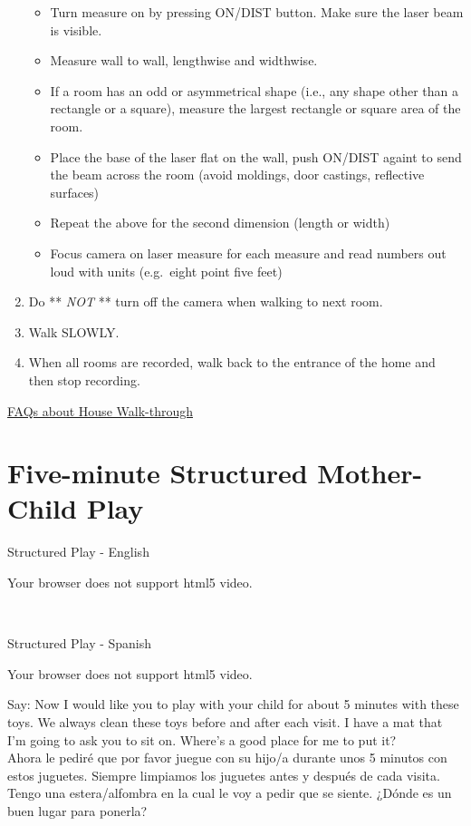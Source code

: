 \documentclass[
]{book}
\providecommand{\tightlist}{%
  \setlength{\itemsep}{0pt}\setlength{\parskip}{0pt}}
\begin{document}
\begin{enumerate}
  \begin{itemize}
  \tightlist
  \item
    Turn measure on by pressing ON/DIST button. Make sure the laser beam is visible.
  \item
    Measure wall to wall, lengthwise and widthwise.
  \item
    If a room has an odd or asymmetrical shape (i.e., any shape other than a rectangle or a square), measure the largest rectangle or square area of the room.
  \item
    Place the base of the laser flat on the wall, push ON/DIST againt to send the beam across the room (avoid moldings, door castings, reflective surfaces)
  \item
    Repeat the above for the second dimension (length or width)
  \item
    Focus camera on laser measure for each measure and read numbers out loud with units (e.g.~eight point five feet)
  \end{itemize}
\item
  Do ** \emph{NOT} ** turn off the camera when walking to next room.
\item
  Walk SLOWLY.
\item
  When all rooms are recorded, walk back to the entrance of the home and then stop recording.
\end{enumerate}

\protect\hyperlink{faqs_walkthrough}{FAQs about House Walk-through}

\hypertarget{five-minute-structured-mother-child-play}{%
\section{Five-minute Structured Mother-Child Play}\label{five-minute-structured-mother-child-play}}

Structured Play - English

Your browser does not support html5 video.

 

Structured Play - Spanish

Your browser does not support html5 video.

Say: Now I would like you to play with your child for about 5 minutes with these toys. We always clean these toys before and after each visit. I have a mat that I'm going to ask you to sit on. Where's a good place for me to put it?
    Ahora le pediré que por favor juegue con su hijo/a durante unos 5 minutos con estos juguetes. Siempre limpiamos los juguetes antes y después de cada visita. Tengo una estera/alfombra en la cual le voy a pedir que se siente. ¿Dónde es un buen lugar para ponerla?
\end{document}
